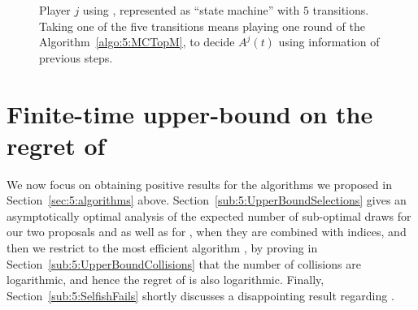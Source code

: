 \begin{figure}[h!]
  \caption[``State-machine'' representation of \MCTopM]{Player $j$ using \MCTopM, represented as ``state machine'' with $5$ transitions.
  Taking one of the five transitions means playing one round of the Algorithm~\ref{algo:5:MCTopM}, to decide $A^j(t)$ using information of previous steps.}
  \label{fig:5:StateMachineAlgorithm_MCTopM}
\end{figure}



\section{Finite-time upper-bound on the regret of \MCTopM}
\label{sec:5:upperbounds}

We now focus on obtaining positive results for the algorithms we proposed in Section~\ref{sec:5:algorithms} above.
Section~\ref{sub:5:UpperBoundSelections} gives
an asymptotically optimal analysis of the expected number of sub-optimal draws
for our two proposals \RandTopM{} and \MCTopM{} as well as for \rhoRand{}, when they are combined with \klUCB{} indices,
and then we restrict to the most efficient algorithm \MCTopM, by proving in Section~\ref{sub:5:UpperBoundCollisions} that the number of collisions are logarithmic, and hence the regret of \MCTopM{} is also logarithmic.
%
Finally, Section~\ref{sub:5:SelfishFails} shortly discusses a disappointing result regarding \Selfish.


